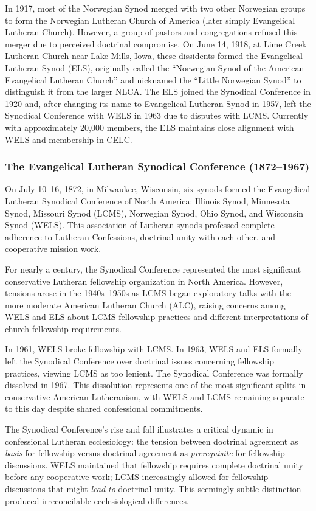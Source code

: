 In 1917, most of the Norwegian Synod merged with two other Norwegian groups to form the Norwegian Lutheran Church of America (later simply Evangelical Lutheran Church). However, a group of pastors and congregations refused this merger due to perceived doctrinal compromise. On June 14, 1918, at Lime Creek Lutheran Church near Lake Mills, Iowa, these dissidents formed the Evangelical Lutheran Synod (ELS), originally called the ``Norwegian Synod of the American Evangelical Lutheran Church'' and nicknamed the ``Little Norwegian Synod'' to distinguish it from the larger NLCA. The ELS joined the Synodical Conference in 1920 and, after changing its name to Evangelical Lutheran Synod in 1957, left the Synodical Conference with WELS in 1963 due to disputes with LCMS. Currently with approximately 20,000 members, the ELS maintains close alignment with WELS and membership in CELC.

\subsubsection{The Evangelical Lutheran Synodical Conference (1872--1967)}

On July 10--16, 1872, in Milwaukee, Wisconsin, six synods formed the Evangelical Lutheran Synodical Conference of North America: Illinois Synod, Minnesota Synod, Missouri Synod (LCMS), Norwegian Synod, Ohio Synod, and Wisconsin Synod (WELS). This association of Lutheran synods professed complete adherence to Lutheran Confessions, doctrinal unity with each other, and cooperative mission work.

For nearly a century, the Synodical Conference represented the most significant conservative Lutheran fellowship organization in North America. However, tensions arose in the 1940s--1950s as LCMS began exploratory talks with the more moderate American Lutheran Church (ALC), raising concerns among WELS and ELS about LCMS fellowship practices and different interpretations of church fellowship requirements.

In 1961, WELS broke fellowship with LCMS. In 1963, WELS and ELS formally left the Synodical Conference over doctrinal issues concerning fellowship practices, viewing LCMS as too lenient. The Synodical Conference was formally dissolved in 1967. This dissolution represents one of the most significant splits in conservative American Lutheranism, with WELS and LCMS remaining separate to this day despite shared confessional commitments.

The Synodical Conference's rise and fall illustrates a critical dynamic in confessional Lutheran ecclesiology: the tension between doctrinal agreement as \textit{basis} for fellowship versus doctrinal agreement as \textit{prerequisite} for fellowship discussions. WELS maintained that fellowship requires complete doctrinal unity before any cooperative work; LCMS increasingly allowed for fellowship discussions that might \textit{lead to} doctrinal unity. This seemingly subtle distinction produced irreconcilable ecclesiological differences.

